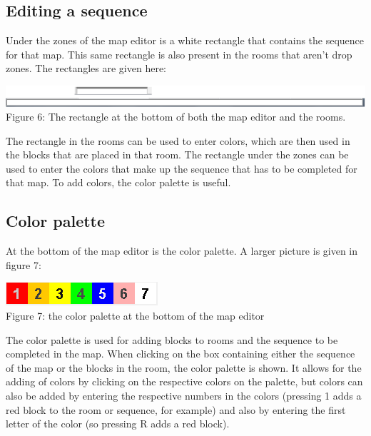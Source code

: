 \subsection{Editing a sequence}
Under the zones of the map editor is a white rectangle that contains the sequence for that map. This same rectangle is also present in the rooms that aren't drop zones. The rectangles are given here:
\begin{center}
	\centering
	\includegraphics[scale=0.5]{SequenceEditor.png}\\
	Figure 6: The rectangle at the bottom of both the map editor and the rooms.
\end{center}
The rectangle in the rooms can be used to enter colors, which are then used in the blocks that are placed in that room. The rectangle under the zones can be used to enter the colors that make up the sequence that has to be completed for that map. To add colors, the color palette is useful.
\subsection{Color palette}
At the bottom of the map editor is the color palette. A larger picture is given in figure 7:
\begin{center}
	\centering
	\includegraphics{ColorPalette.png}\\
	Figure 7: the color palette at the bottom of the map editor
\end{center}
The color palette is used for adding blocks to rooms and the sequence to be completed in the map. When clicking on the box containing either the sequence of the map or the blocks in the room, the color palette is shown. It allows for the adding of colors by clicking on the respective colors on the palette, but colors can also be added by entering the respective numbers in the colors (pressing 1 adds a red block to the room or sequence, for example) and also by entering the first letter of the color (so pressing R adds a red block).
